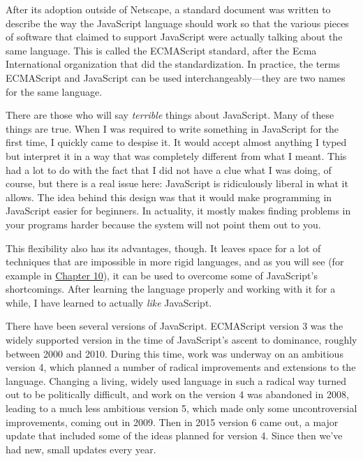 After its adoption outside of Netscape, a standard document was written to describe the way the JavaScript language should work so that the various pieces of software that claimed to support JavaScript were actually talking about the same language. This is called the ECMAScript standard, after the Ecma International organization that did the standardization. In practice, the terms ECMAScript and JavaScript can be used interchangeably—they are two names for the same language.

There are those who will say \emph{terrible} things about JavaScript. Many of these things are true. When I was required to write something in JavaScript for the first time, I quickly came to despise it. It would accept almost anything I typed but interpret it in a way that was completely different from what I meant. This had a lot to do with the fact that I did not have a clue what I was doing, of course, but there is a real issue here: JavaScript is ridiculously liberal in what it allows. The idea behind this design was that it would make programming in JavaScript easier for beginners. In actuality, it mostly makes finding problems in your programs harder because the system will not point them out to you.

This flexibility also has its advantages, though. It leaves space for a lot of techniques that are impossible in more rigid languages, and as you will see (for example in \hyperref[modules]{Chapter 10}), it can be used to overcome some of JavaScript's shortcomings. After learning the language properly and working with it for a while, I have learned to actually \emph{like} JavaScript.

There have been several versions of JavaScript. ECMAScript version 3 was the widely supported version in the time of JavaScript's ascent to dominance, roughly between 2000 and 2010. During this time, work was underway on an ambitious version 4, which planned a number of radical improvements and extensions to the language. Changing a living, widely used language in such a radical way turned out to be politically difficult, and work on the version 4 was abandoned in 2008, leading to a much less ambitious version 5, which made only some uncontroversial improvements, coming out in 2009. Then in 2015 version 6 came out, a major update that included some of the ideas planned for version 4. Since then we've had new, small updates every year.

